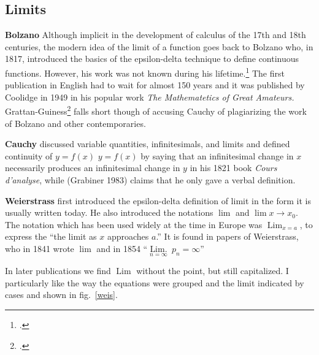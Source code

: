{\subsection*{Limits}


\textbf{Bolzano} Although implicit in the development of calculus of the 17th and 18th centuries, the modern idea of the limit of a function goes back to Bolzano who, in 1817, introduced the basics of the epsilon-delta technique to define continuous functions. However, his work was not known during his lifetime.\footcite{coolidge} The first publication in English had to wait for almost 150 years and it was published by Coolidge in 1949 in his popular work \emph{The Mathematetics of Great Amateurs.} Grattan-Guiness\footcite{grattan-guiness} falls short though of accusing Cauchy of plagiarizing the work of Bolzano and other contemporaries.


\textbf{Cauchy} discussed variable quantities, infinitesimals, and limits and defined continuity of {$\displaystyle y=f(x)$} $y=f(x)$ by saying that an infinitesimal change in $x$ necessarily produces an infinitesimal change in $y$ in his 1821 book \emph{Cours d'analyse}, while (Grabiner 1983) claims that he only gave a verbal definition. 

\textbf{Weierstrass} first introduced the epsilon-delta definition of limit in the form it is usually written today. He also introduced the notations $\lim$ and $\lim x\rightarrow x_0$. The notation which has been used widely at the time in Europe was
$\operatorname{Lim}_{x=a}$, to express the \enquote{the limit as $x$ approaches $a$.} It is found in papers of Weierstrass, who in 1841 wrote $\lim$ and in 1854 \enquote{$\underset{n=\infty}{\operatorname{Lim.}}\:p_n = \infty $}

In later publications we find $\operatorname{Lim}$ without the point, but still capitalized. I particularly like the way the equations were grouped and the limit indicated by cases and shown in fig.~\ref{weis}.

}
